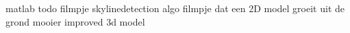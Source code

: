 
matlab todo
	filmpje skylinedetection algo
	filmpje dat een 2D model groeit uit de grond
	mooier improved 3d model
